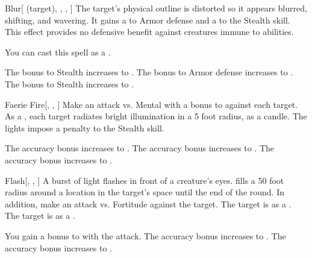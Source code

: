 \lowercase{\hypertarget{spell:Blur}{}}\label{spell:Blur}
\begin{attuneability}[Rank 1]{\hypertarget{spell:Blur}{Blur}}[ (target), , , ]
The target's physical outline is distorted so it appears blurred, shifting, and wavering.
It gains a   to Armor defense and a   to the Stealth skill.
This effect provides no defensive benefit against creatures immune to  abilities.

You can cast this spell as a .

\rankline
{} The bonus to Stealth increases to .
 The bonus to Armor defense increases to .
 The bonus to Stealth increases to .
\end{attuneability}
\vspace{0.25em}



\lowercase{\hypertarget{spell:Faerie Fire}{}}\label{spell:Faerie Fire}
\begin{freeability}[Rank 1]{\hypertarget{spell:Faerie Fire}{Faerie Fire}}[, , ]
Make an attack vs. Mental with a  bonus to  against each target.
\hit As a , each target radiates bright illumination in a 5 foot radius, as a candle.
The lights impose a  penalty to the Stealth skill.

\rankline
{} The accuracy bonus increases to .
 The accuracy bonus increases to .
 The accuracy bonus increases to .
\end{freeability}
\vspace{0.25em}



\lowercase{\hypertarget{spell:Flash}{}}\label{spell:Flash}
\begin{freeability}[Rank 1]{\hypertarget{spell:Flash}{Flash}}[, , ]
A burst of light flashes in front of a creature's eyes.
 fills a 50 foot radius around a location in the target's space until the end of the round.
In addition, make an attack vs. Fortitude against the target.
\hit The target is  as a .
\crit The target is  as a .

\rankline
{} You gain a  bonus to  with the attack.
 The accuracy bonus increases to .
 The accuracy bonus increases to .
\end{freeability}
\vspace{0.25em}



